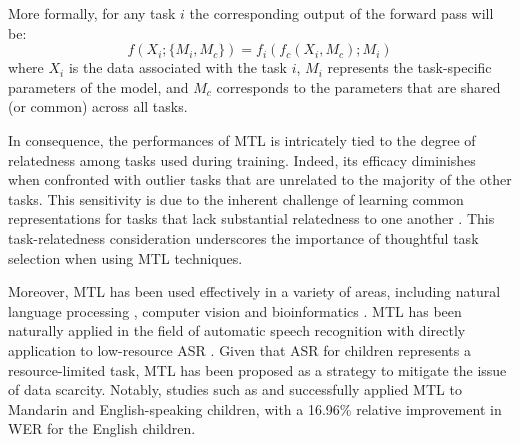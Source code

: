More formally, for any task $i$ the corresponding output of the forward pass will be:
\begin{equation} \label{equation:MT}
    f(X_i;\{M_i, M_{c}\}) = f_i(f_{c}(X_i,{M_{c}}); {M_i}) 
\end{equation}
where $X_i$ is the data associated with the task $i$, $M_i$ represents the task-specific parameters of the model, and $M_{c}$ corresponds to the parameters that are shared (or common) across all tasks.

In consequence, the performances of MTL is intricately tied to the degree of relatedness among tasks used during training. Indeed, its efficacy diminishes when confronted with outlier tasks that are unrelated to the majority of the other tasks. This sensitivity is due to the inherent challenge of learning common representations for tasks that lack substantial relatedness to one another \cite{zhang2018overview}. This task-relatedness consideration underscores the importance of thoughtful task selection when using MTL techniques.

Moreover, MTL has been used effectively in a variety of areas, including natural language processing \cite{multi-nlp}, computer vision \cite{mtl_computervision} and bioinformatics \cite{bioinfo}. MTL has been naturally applied in the field of automatic speech recognition \cite{MTL-LFMMI} with directly application to low-resource ASR \cite{abad2020}. Given that ASR for children represents a resource-limited task, MTL has been proposed as a strategy to mitigate the issue of data scarcity. Notably, studies such as \cite{TransferLF} and \cite{2019multi} successfully applied MTL to Mandarin and English-speaking children, with a 16.96\% relative improvement in WER for the English children.

